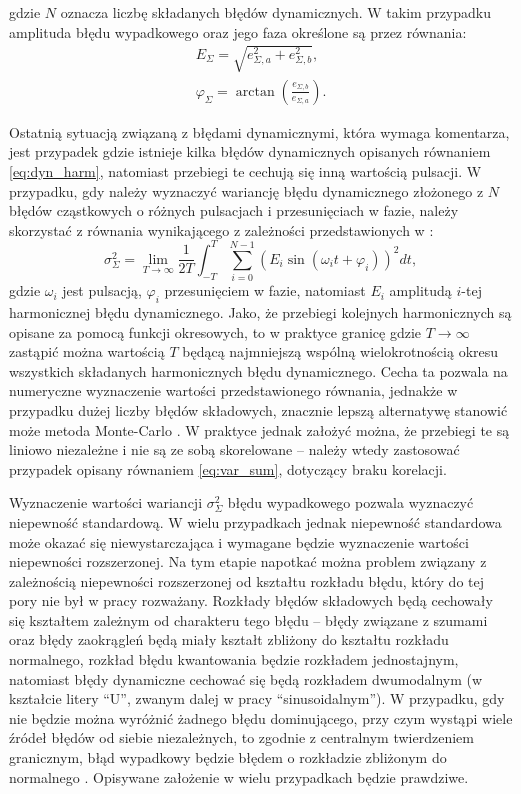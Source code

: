gdzie $N$ oznacza liczbę składanych błędów dynamicznych. W takim przypadku amplituda błędu wypadkowego oraz jego faza określone są przez równania:
\begin{gather}
E_{\Sigma} = \sqrt{e_{\Sigma,a}^{2} + e_{\Sigma,b}^{2}} \label{eq:dyn_vect_amp}, \\
\varphi_{\Sigma} = \arctan \left( \frac{e_{\Sigma,b}}{e_{\Sigma,a}} \right) \label{eq:dyn_vect_phi}.
\end{gather}

Ostatnią sytuacją związaną z błędami dynamicznymi, która wymaga komentarza, jest przypadek gdzie istnieje kilka błędów dynamicznych opisanych równaniem \eqref{eq:dyn_harm}, natomiast przebiegi te cechują się inną wartością pulsacji. W przypadku, gdy należy wyznaczyć wariancję błędu dynamicznego złożonego z $N$ błędów cząstkowych o różnych pulsacjach i przesunięciach w fazie, należy skorzystać z równania wynikającego z zależności przedstawionych w \cite{proakis_dsp}:
\begin{equation}
\sigma_{\Sigma}^{2} = \lim _{T \to \infty} \frac{1}{2T} \int _{-T} ^{T} \sum _{i = 0} ^{N -1} \left( E_{i} \sin \left( \omega_{i} t + \varphi_{i} \right) \right)^{2} dt \label{eq:dyn_multi},
\end{equation}
gdzie $\omega_{i}$ jest pulsacją, $\varphi_{i}$ przesunięciem w fazie, natomiast $E_{i}$ amplitudą $i$-tej harmonicznej błędu dynamicznego. Jako, że przebiegi kolejnych harmonicznych są opisane za pomocą funkcji okresowych, to w praktyce granicę gdzie $T \to \infty$ zastąpić można wartością $T$ będącą najmniejszą wspólną wielokrotnością okresu wszystkich składanych harmonicznych błędu dynamicznego. Cecha ta pozwala na numeryczne wyznaczenie wartości przedstawionego równania, jednakże w przypadku dużej liczby błędów składowych, znacznie lepszą alternatywę stanowić może metoda Monte-Carlo \cite{roj_annuncertainty, janssen_montecarlo}. W praktyce jednak założyć można, że przebiegi te są liniowo niezależne i nie są ze sobą skorelowane \cite{proakis_dsp} -- należy wtedy zastosować przypadek opisany równaniem \eqref{eq:var_sum}, dotyczący braku korelacji.

Wyznaczenie wartości wariancji $\sigma_{\Sigma}^{2}$ błędu wypadkowego pozwala wyznaczyć niepewność standardową. W wielu przypadkach jednak niepewność standardowa może okazać się niewystarczająca i wymagane będzie wyznaczenie wartości niepewności rozszerzonej. Na tym etapie napotkać można problem związany z zależnością niepewności rozszerzonej od kształtu rozkładu błędu, który do tej pory nie był w pracy rozważany. Rozkłady błędów składowych będą cechowały się kształtem zależnym od charakteru tego błędu -- błędy związane z szumami oraz błędy zaokrągleń będą miały kształt zbliżony do kształtu rozkładu normalnego, rozkład błędu kwantowania będzie rozkładem jednostajnym, natomiast błędy dynamiczne cechować się będą rozkładem dwumodalnym (w kształcie litery \enquote{U}, zwanym dalej w pracy \enquote{sinusoidalnym}). W przypadku, gdy nie będzie można wyróżnić żadnego błędu dominującego, przy czym wystąpi wiele źródeł błędów od siebie niezależnych, to zgodnie z centralnym twierdzeniem granicznym, błąd wypadkowy będzie błędem o rozkładzie zbliżonym do normalnego \cite{jcgm_guide}. Opisywane założenie w wielu przypadkach będzie prawdziwe.


